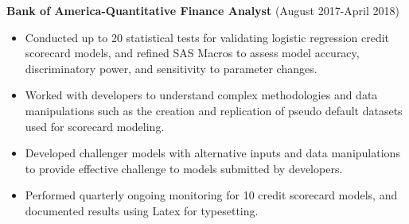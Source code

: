 \documentclass[a4paper,10pt]{article}
\begin{document}
\noindent
\textbf{Bank of America-Quantitative Finance Analyst} (August 2017-April 2018)
\begin{itemize}
\item Conducted up to 20 statistical tests for validating logistic regression credit scorecard models, and refined SAS Macros to assess model accuracy, discriminatory power, and sensitivity to parameter changes.
\item Worked with developers to understand complex methodologies and data manipulations such as the creation and replication of pseudo default datasets used for scorecard modeling.
\item Developed challenger models with alternative inputs and data manipulations to provide effective challenge to models submitted by developers.
\item Performed quarterly ongoing monitoring for 10 credit scorecard models, and documented results using Latex for typesetting.
\end{itemize}
\end{document}
